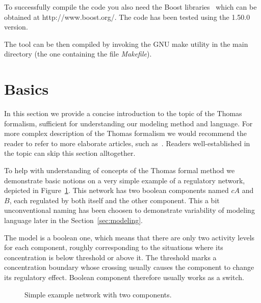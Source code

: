 \documentclass[12pt]{article}
\begin{document}
To successfully compile the code you also need the Boost libraries~\cite{Boost} which can be obtained at http://www.boost.org/. The code has been tested using the 1.50.0 version.

The tool can be then compiled by invoking the GNU make utility in the main directory (the one containing the file \emph{Makefile}).

\section{Basics}
In this section we provide a concise introduction to the topic of the Thomas formalism, sufficient for understanding our modeling method and language. For more complex description of the Thomas formalism we would recommend the reader to refer to more elaborate articles, such as~\cite{ThomasR1991}. Readers well-established in the topic can skip this section alltogether.

To help with understanding of concepts of the Thomas formal method we demonstrate basic notions on a very simple example of a regulatory network, depicted in Figure~\ref{ExampNet}. This network has two boolean components named $cA$ and $B$, each regulated by both itself and the other component. This a bit unconventional naming has been choosen to demonstrate variability of modeling language later in the Section~\ref{sec:modeling}.

The model is a boolean one, which means that there are only two activity levels for each component, roughly corresponding to the situations where its concentration is below threshold or above it. The threshold marks a concentration boundary whose crossing usually causes the component to change its regulatory effect. Boolean component therefore usually works as a switch.

\begin{figure}[b]
\centering
{}
\caption{Simple example network with two components.}
\label{ExampNet}
\end{figure}
\end{document}
